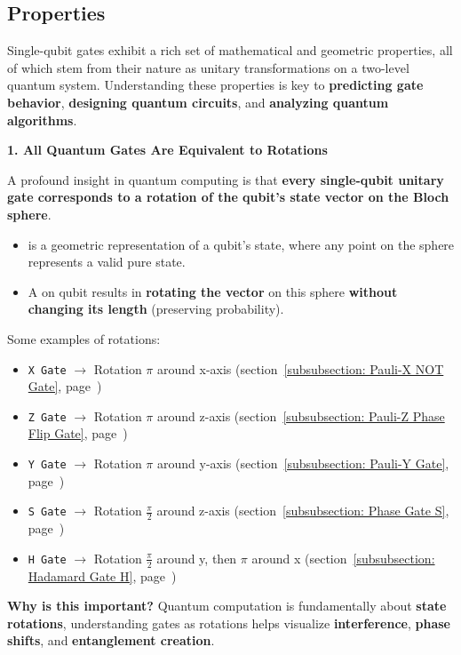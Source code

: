 \subsection{Properties}

Single-qubit gates exhibit a rich set of mathematical and geometric properties, all of which stem from their nature as unitary transformations on a two-level quantum system. Understanding these properties is key to \textbf{predicting gate behavior}, \textbf{designing quantum circuits}, and \textbf{analyzing quantum algorithms}.

\highspace
\begin{flushleft}
    \textcolor{Green3}{\textbf{1. All Quantum Gates Are Equivalent to Rotations}}
\end{flushleft}
A profound insight in quantum computing is that \textbf{every single-qubit unitary gate corresponds to a rotation of the qubit's state vector on the Bloch sphere}.
\begin{itemize}
    \item {} is a geometric representation of a qubit's state, where any point on the sphere represents a valid pure state.
    \item A  on qubit results in \textbf{rotating the vector} on this sphere \textbf{without changing its length} (preserving probability).
\end{itemize}
Some examples of rotations:
\begin{itemize}
    \item \texttt{X Gate} $\rightarrow$ Rotation $\pi$ around x-axis (section~\ref{subsubsection: Pauli-X NOT Gate}, page~\pageref{subsubsection: Pauli-X NOT Gate})
    \item \texttt{Z Gate} $\rightarrow$ Rotation $\pi$ around z-axis (section~\ref{subsubsection: Pauli-Z Phase Flip Gate}, page~\pageref{subsubsection: Pauli-Z Phase Flip Gate})
    \item \texttt{Y Gate} $\rightarrow$ Rotation $\pi$ around y-axis (section~\ref{subsubsection: Pauli-Y Gate}, page~\pageref{subsubsection: Pauli-Y Gate})
    \item \texttt{S Gate} $\rightarrow$ Rotation $\frac{\pi}{2}$ around z-axis (section~\ref{subsubsection: Phase Gate S}, page~\pageref{subsubsection: Phase Gate S})
    \item \texttt{H Gate} $\rightarrow$ Rotation $\frac{\pi}{2}$ around y, then $\pi$ around x (section~\ref{subsubsection: Hadamard Gate H}, page~\pageref{subsubsection: Hadamard Gate H})
\end{itemize}
\textcolor{Green3}{ \textbf{Why is this important?}} Quantum computation is fundamentally about \textbf{state rotations}, understanding gates as rotations helps visualize \textbf{interference}, \textbf{phase shifts}, and \textbf{entanglement creation}.

